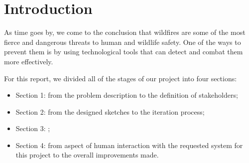 \chapter{Introduction} \label{intro}
As time goes by, we come to the conclusion that wildfires are 
some of the most fierce and dangerous threats to human and 
wildlife safety. One of the ways to prevent them is by using 
technological tools that can detect and combat them more 
effectively. \par 
For this report, we divided all of the stages of our project 
into four sections: 
\begin{itemize}
    \item Section 1: from the problem description to the 
    definition of stakeholders;
    \item Section 2: from the designed sketches to the iteration 
    process;
    \item Section 3: ; 
    \item Section 4: from aspect of human interaction with the 
    requested system for this project to the overall improvements made.
\end{itemize}